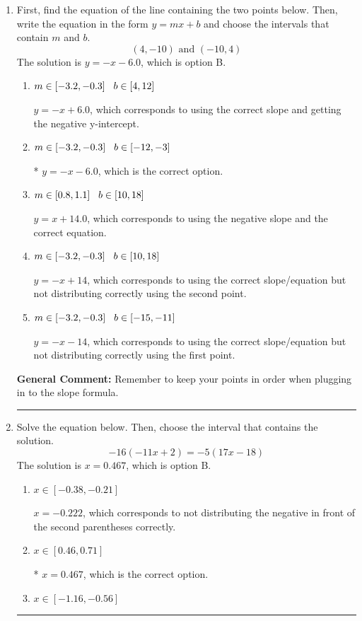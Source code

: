 \documentclass{extbook}[14pt]
\newcommand{\litem}[1]{\item #1

\rule{\textwidth}{0.4pt}}
\begin{document}
\begin{enumerate}\litem{
First, find the equation of the line containing the two points below. Then, write the equation in the form $ y=mx+b $ and choose the intervals that contain $m$ and $b$.
\[ (4, -10) \text{ and } (-10, 4) \]The solution is \( y = -x -6.0 \), which is option B.\begin{enumerate}[label=\Alph*.]
\item \( m \in [-3.2, -0.3] \hspace*{3mm} b \in [4, 12] \)

 $y = -x + 6.0$, which corresponds to using the correct slope and getting the negative y-intercept.
\item \( m \in [-3.2, -0.3] \hspace*{3mm} b \in [-12, -3] \)

* $y = -x -6.0$, which is the correct option.
\item \( m \in [0.8, 1.1] \hspace*{3mm} b \in [10, 18] \)

 $y = x + 14.0$, which corresponds to using the negative slope and the correct equation.
\item \( m \in [-3.2, -0.3] \hspace*{3mm} b \in [10, 18] \)

 $y = -x + 14$, which corresponds to using the correct slope/equation but not distributing correctly using the second point.
\item \( m \in [-3.2, -0.3] \hspace*{3mm} b \in [-15, -11] \)

 $y = -x -14$, which corresponds to using the correct slope/equation but not distributing correctly using the first point.
\end{enumerate}

\textbf{General Comment:} Remember to keep your points in order when plugging in to the slope formula.
}
\litem{
Solve the equation below. Then, choose the interval that contains the solution.
\[ -16(-11x + 2) = -5(17x -18) \]The solution is \( x = 0.467 \), which is option B.\begin{enumerate}[label=\Alph*.]
\item \( x \in [-0.38, -0.21] \)

$x = -0.222$, which corresponds to not distributing the negative in front of the second parentheses correctly.
\item \( x \in [0.46, 0.71] \)

* $x = 0.467$, which is the correct option.
\item \( x \in [-1.16, -0.56] \)


\end{enumerate}}
\end{enumerate}
\end{document}
